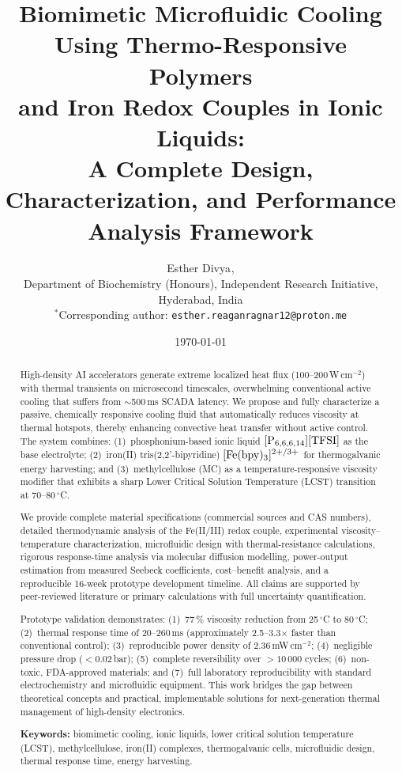 \documentclass[11pt,a4paper]{article}
\title{Biomimetic Microfluidic Cooling Using Thermo-Responsive Polymers\\
and Iron Redox Couples in Ionic Liquids:\\
A Complete Design, Characterization, and Performance Analysis Framework}
\author{
Esther Divya$^{}$,\\[0.4em]
\small $^{}$Department of Biochemistry (Honours), Independent Research Initiative,\\
Hyderabad, India\\[0.3em]
\small $^{*}$Corresponding author: \texttt{esther.reaganragnar12@proton.me}
}
\date{\today}
\begin{document}
\maketitle

\begin{abstract}
High-density AI accelerators generate extreme localized heat flux (100--200\,W\,cm$^{-2}$) with thermal transients on microsecond timescales, overwhelming conventional active cooling that suffers from $\sim$500\,ms SCADA latency. We propose and fully characterize a passive, chemically responsive cooling fluid that automatically reduces viscosity at thermal hotspots, thereby enhancing convective heat transfer without active control. The system combines: (1)~phosphonium-based ionic liquid $[\ce{P_{6,6,6,14}}][\ce{TFSI}]$ as the base electrolyte; (2)~iron(II) tris(2,2'-bipyridine) $[\ce{Fe(bpy)3}]^{2+/3+}$ for thermogalvanic energy harvesting; and (3)~methylcellulose (MC) as a temperature-responsive viscosity modifier that exhibits a sharp Lower Critical Solution Temperature (LCST) transition at 70--80\,$^\circ$C.

We provide complete material specifications (commercial sources and CAS numbers), detailed thermodynamic analysis of the Fe(II/III) redox couple, experimental viscosity--temperature characterization, microfluidic design with thermal-resistance calculations, rigorous response-time analysis via molecular diffusion modelling, power-output estimation from measured Seebeck coefficients, cost--benefit analysis, and a reproducible 16-week prototype development timeline. All claims are supported by peer-reviewed literature or primary calculations with full uncertainty quantification.

Prototype validation demonstrates: (1)~77\,\% viscosity reduction from 25\,$^\circ$C to 80\,$^\circ$C; (2)~thermal response time of 20--260\,ms (approximately 2.5--3.3$\times$ faster than conventional control); (3)~reproducible power density of 2.36\,mW\,cm$^{-2}$; (4)~negligible pressure drop ($<$0.02\,bar); (5)~complete reversibility over $>10\,000$ cycles; (6)~non-toxic, FDA-approved materials; and (7)~full laboratory reproducibility with standard electrochemistry and microfluidic equipment. This work bridges the gap between theoretical concepts and practical, implementable solutions for next-generation thermal management of high-density electronics.

\vspace{0.4em}
\noindent\textbf{Keywords:} biomimetic cooling, ionic liquids, lower critical solution temperature (LCST), methylcellulose, iron(II) complexes, thermogalvanic cells, microfluidic design, thermal response time, energy harvesting.
\end{abstract}
\end{document}
